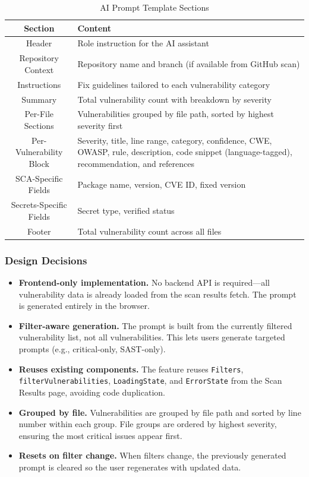 \documentclass[12pt,a4paper]{report}
\begin{document}
\begin{table}[H]
\centering
\caption{AI Prompt Template Sections}
\label{tab:ai_prompt_template}
\begin{tabular}{|c|p{10cm}|}
\hline
\textbf{Section} & \textbf{Content} \\
\hline
Header & Role instruction for the AI assistant \\
\hline
Repository Context & Repository name and branch (if available from GitHub scan) \\
\hline
Instructions & Fix guidelines tailored to each vulnerability category \\
\hline
Summary & Total vulnerability count with breakdown by severity \\
\hline
Per-File Sections & Vulnerabilities grouped by file path, sorted by highest severity first \\
\hline
Per-Vulnerability Block & Severity, title, line range, category, confidence, CWE, OWASP, rule, description, code snippet (language-tagged), recommendation, and references \\
\hline
SCA-Specific Fields & Package name, version, CVE ID, fixed version \\
\hline
Secrets-Specific Fields & Secret type, verified status \\
\hline
Footer & Total vulnerability count across all files \\
\hline
\end{tabular}
\end{table}

\subsubsection{Design Decisions}

\begin{itemize}
    \item \textbf{Frontend-only implementation.} No backend API is required---all vulnerability data is already loaded from the scan results fetch. The prompt is generated entirely in the browser.
    \item \textbf{Filter-aware generation.} The prompt is built from the currently filtered vulnerability list, not all vulnerabilities. This lets users generate targeted prompts (e.g., critical-only, SAST-only).
    \item \textbf{Reuses existing components.} The feature reuses \texttt{Filters}, \texttt{filterVulnerabilities}, \texttt{LoadingState}, and \texttt{ErrorState} from the Scan Results page, avoiding code duplication.
    \item \textbf{Grouped by file.} Vulnerabilities are grouped by file path and sorted by line number within each group. File groups are ordered by highest severity, ensuring the most critical issues appear first.
    \item \textbf{Resets on filter change.} When filters change, the previously generated prompt is cleared so the user regenerates with updated data.
\end{itemize}
\end{document}
